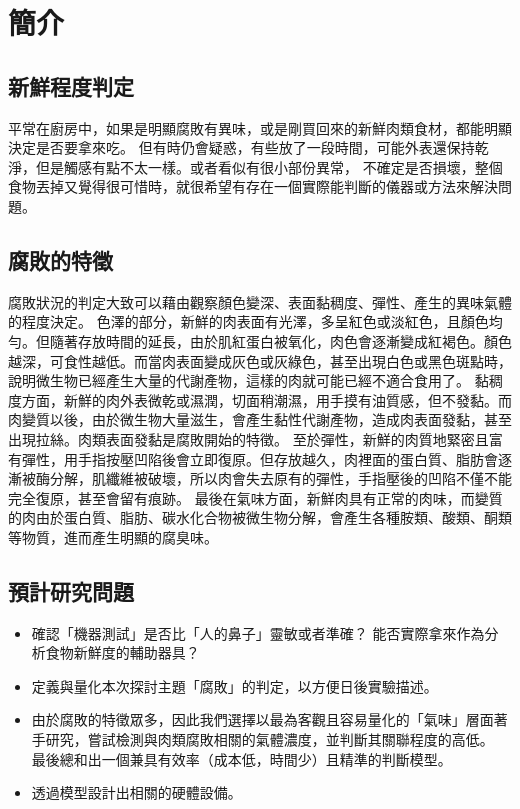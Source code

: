 \chapter{簡介}

\section{新鮮程度判定}
平常在廚房中，如果是明顯腐敗有異味，或是剛買回來的新鮮肉類食材，都能明顯決定是否要拿來吃。
但有時仍會疑惑，有些放了一段時間，可能外表還保持乾淨，但是觸感有點不太一樣。或者看似有很小部份異常，
不確定是否損壞，整個食物丟掉又覺得很可惜時，就很希望有存在一個實際能判斷的儀器或方法來解決問題。

\section{腐敗的特徵}
腐敗狀況的判定大致可以藉由觀察顏色變深、表面黏稠度、彈性、產生的異味氣體的程度決定。
色澤的部分，新鮮的肉表面有光澤，多呈紅色或淡紅色，且顏色均勻。但隨著存放時間的延長，由於肌紅蛋白被氧化，肉色會逐漸變成紅褐色。顏色越深，可食性越低。而當肉表面變成灰色或灰綠色，甚至出現白色或黑色斑點時，說明微生物已經產生大量的代謝產物，這樣的肉就可能已經不適合食用了。
黏稠度方面，新鮮的肉外表微乾或濕潤，切面稍潮濕，用手摸有油質感，但不發黏。而肉變質以後，由於微生物大量滋生，會產生黏性代謝產物，造成肉表面發黏，甚至出現拉絲。肉類表面發黏是腐敗開始的特徵。
至於彈性，新鮮的肉質地緊密且富有彈性，用手指按壓凹陷後會立即復原。但存放越久，肉裡面的蛋白質、脂肪會逐漸被酶分解，肌纖維被破壞，所以肉會失去原有的彈性，手指壓後的凹陷不僅不能完全復原，甚至會留有痕跡。
最後在氣味方面，新鮮肉具有正常的肉味，而變質的肉由於蛋白質、脂肪、碳水化合物被微生物分解，會產生各種胺類、酸類、酮類等物質，進而產生明顯的腐臭味。

\section{預計研究問題}
\begin{itemize}
	\item 確認「機器測試」是否比「人的鼻子」靈敏或者準確？
		能否實際拿來作為分析食物新鮮度的輔助器具？
	\item 定義與量化本次探討主題「腐敗」的判定，以方便日後實驗描述。
	\item 由於腐敗的特徵眾多，因此我們選擇以最為客觀且容易量化的「氣味」層面著手研究，嘗試檢測與肉類腐敗相關的氣體濃度，並判斷其關聯程度的高低。
		最後總和出一個兼具有效率（成本低，時間少）且精準的判斷模型。
	\item 透過模型設計出相關的硬體設備。
\end{itemize}
